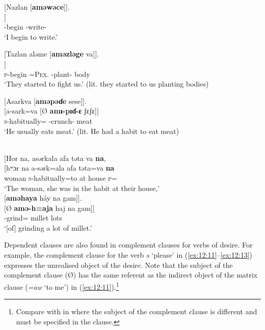 \ea \label{ex:12:7}
[Nazlan  [\textbf{aməwəce}]].\\
\gll  [na-ɮaŋ    [Ø \textbf{amu-wutʃ-ɛ}]]\\
      {\oneS}-begin    {}  {\DEP}-write-{\CL}\\
\glt  ‘I begin to write.’ 
\z 

\ea \label{ex:12:8}
[Tazlan  aləme  [\textbf{aməzləge} va]].\\
\gll  [ta-ɮaŋ     =alɪmɛ  [Ø \textbf{amɪ-ɮɪg-ɛ}  va]]\\
      \textsc{p}-begin   =\textsc{Pex}.{\IO}   {} {\DEP}-plant-{\CL}  body\\
\glt  ‘They started to fight us.’ (lit. they started to us planting bodies) 
\z 

\ea \label{ex:12:9}
{}[Asarkva  [\textbf{aməpəɗe} sese]].\\
\gll  {}[a-sark=va  [Ø \textbf{amɪ-pɪɗ-ɛ}   ʃɛʃɛ]]\\
      \textsc{s}-{habitually}={\PRF}  {}  {\DEP}-crunch-{\CL}  meat\\
\glt  ‘He usually eats meat.’ (lit. He had a habit to eat meat)
\z 

\ea \label{ex:12:10}
\\
{}[Hor  na,  asərkala  afa  təta  va \textbf{na},\\  
\gll  {}[hʷɔr  na  a-sərk=ala   afa   təta=va \textbf{na}\\ 
      woman    {\PSP}  \textsc{s}-{habitually}=to  {at house}  \textsc{p}={\PRF}  {\PSP} \\
\glt ‘The woman, she was in the habit at their house,’\\
      
      \medskip
{}[\textbf{aməhaya} háy  na  gam]].\\     
\gll {}[Ø  \textbf{amə-h=aja} haj na gam]]\\
     {} {\DEP}-grind={\PLU}  millet  {\PSP}  lots\\
\glt  ‘[of] grinding a lot of millet.’
\z 

Dependent clauses are also found in complement clauses for verbs of desire. For example, the complement clause for the verb  \textit{s} ‘please’ in (\ref{ex:12:11}--\ref{ex:12:13}) expresses the unrealised object of the desire. Note that the subject of the complement clause (Ø) has the same referent as the indirect object of the matrix clause (\textit{=aw} ‘to me’) in (\ref{ex:12:11}).\footnote{Compare with  in  where the subject of the complement clause is different and must be specified in the clause.} 

